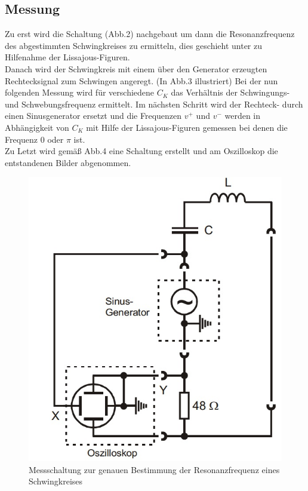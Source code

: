 \subsection{Messung}
Zu erst wird die Schaltung (Abb.2) nachgebaut um dann die Resonanzfrequenz des abgestimmten Schwingkreises zu ermitteln, dies geschieht unter zu Hilfenahme der Lissajous-Figuren. \\
Danach wird der Schwingkreis mit einem über den Generator erzeugten Rechtecksignal zum Schwingen angeregt. (In Abb.3 illustriert)
Bei der nun folgenden Messung wird für verschiedene $C_K$ das Verhältnis der Schwingungs- und Schwebungsfrequenz ermittelt.
Im nächsten Schritt wird der Rechteck- durch einen Sinusgenerator ersetzt und die Frequenzen $v^+$ und $v^-$ werden in Abhängigkeit von $C_K$ mit Hilfe der Lissajous-Figuren gemessen bei denen die Frequenz 0 oder $\pi$ ist. \\
Zu Letzt wird gemäß Abb.4 eine Schaltung erstellt und am Oszilloskop die entstandenen Bilder abgenommen. 
\begin{figure}[h]
        \centering
        \includegraphics[scale=0.5]{Grafiken/V355Abb2.jpg}
        \caption{Messschaltung zur genauen Bestimmung der Resonanzfrequenz eines Schwingkreises}
        \label{fig:Abb2}
\end{figure}
